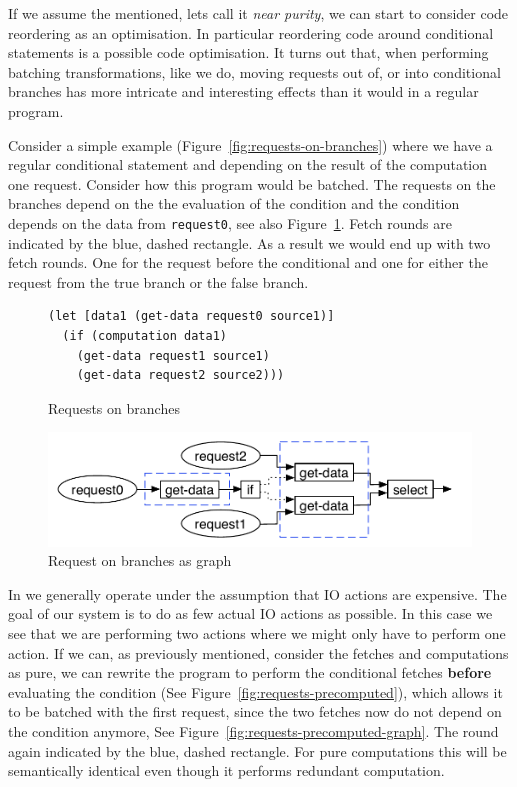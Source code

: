 If we assume the mentioned, lets call it \textit{near purity}, we can start to consider code reordering as an optimisation.
In particular reordering code around conditional statements is a possible code optimisation.
It turns out that, when performing batching transformations, like we do, moving requests out of, or into conditional branches has more intricate and interesting effects than it would in a regular program.

Consider a simple example (Figure~\ref{fig:requests-on-branches}) where we have a regular conditional statement and depending on the result of the computation one request.
Consider how this program would be batched.
The requests on the branches depend on the the evaluation of the condition and the condition depends on the data from \texttt{request0}, see also Figure~\ref{fig:requests-on-branches-graph}.
Fetch rounds are indicated by the blue, dashed rectangle.
As a result we would end up with two fetch rounds.
One for the request before the conditional and one for either the request from the true branch or the false branch.

\begin{figure}
\begin{verbatim}
(let [data1 (get-data request0 source1)]
  (if (computation data1)
    (get-data request1 source1)
    (get-data request2 source2)))
\end{verbatim}
\caption{Requests on branches}
\label{fig:requests-on-branches}
\includegraphics[width=\textwidth]{../Figures/requests-on-branches-graph}
\caption{Request on branches as graph}
\label{fig:requests-on-branches-graph}
\end{figure}

In \yauhau{} we generally operate under the assumption that IO actions are expensive.
The goal of our system is to do as few actual IO actions as possible.
In this case we see that we are performing two actions where we might only have to perform one action.
If we can, as previously mentioned, consider the fetches and computations as pure, we can rewrite the program to perform the conditional fetches \textbf{before} evaluating the condition (See Figure~\ref{fig:requests-precomputed}), which allows it to be batched with the first request, since the two fetches now do not depend on the condition anymore, See Figure~\ref{fig:requests-precomputed-graph}.
The round again indicated by the blue, dashed rectangle.
For pure computations this will be semantically identical even though it performs redundant computation.

